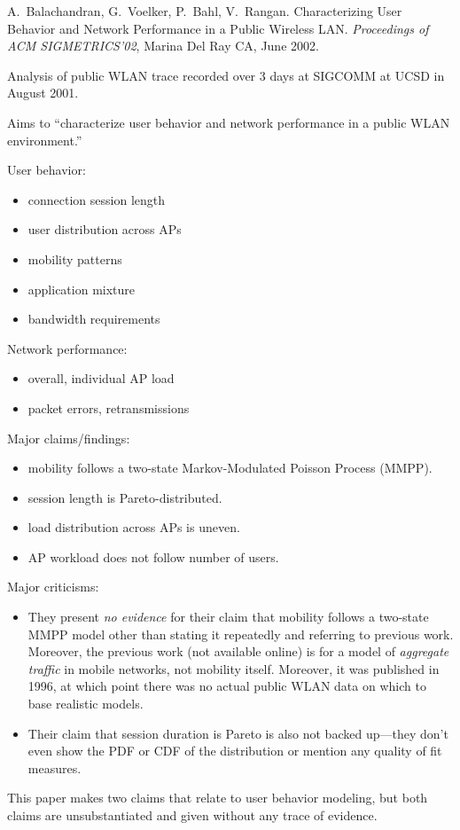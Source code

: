 \documentclass{article}
\newcounter{myEnumCounter}
\newcounter{mySaveCounter}
\renewenvironment{enumerate}{%
  \begin{list}{[\arabic{myEnumCounter}]}{\usecounter{myEnumCounter}%
  \setcounter{myEnumCounter}{\value{mySaveCounter}}}
  }{%
  \setcounter{mySaveCounter}{\value{myEnumCounter}}\end{list}%
}
\begin{document}
\begin{enumerate}
A.~Balachandran, G.~Voelker, P.~Bahl, V.~Rangan.
Characterizing User Behavior and Network Performance in a Public Wireless LAN.
\textit{Proceedings of ACM SIGMETRICS'02}, Marina Del Ray CA, June 2002.

\begin{notes}
\item Analysis of public WLAN trace recorded over 3 days at SIGCOMM at UCSD in August 2001.
\item Aims to ``characterize user behavior and network performance in a public WLAN environment.''
\item User behavior:
\begin{itemize}
	\item connection session length
	\item user distribution across APs
	\item mobility patterns
	\item application mixture
	\item bandwidth requirements
\end{itemize}
\item Network performance:
\begin{itemize}
	\item overall, individual AP load
	\item packet errors, retransmissions
\end{itemize}
\item Major claims/findings:
\begin{itemize}
	\item mobility follows a two-state Markov-Modulated Poisson Process (MMPP).
	\item session length is Pareto-distributed.
	\item load distribution across APs is uneven.
	\item AP workload does not follow number of users.
\end{itemize}
\item Major criticisms:
\begin{itemize}
\item They present \textit{no evidence} for their claim that mobility follows a two-state MMPP model other than stating it repeatedly and referring to previous work. Moreover, the previous work (not available online) is for a model of \textit{aggregate traffic} in mobile networks, not mobility itself. Moreover, it was published in 1996, at which point there was no actual public WLAN data on which to base realistic models.
\item Their claim that session duration is Pareto is also not backed up---they don't even show the PDF or CDF of the distribution or mention any quality of fit measures.
\end{itemize}
\item This paper makes two claims that relate to user behavior modeling, but both claims are unsubstantiated and given without any trace of evidence.
\end{notes}


\end{enumerate}
\end{document}
